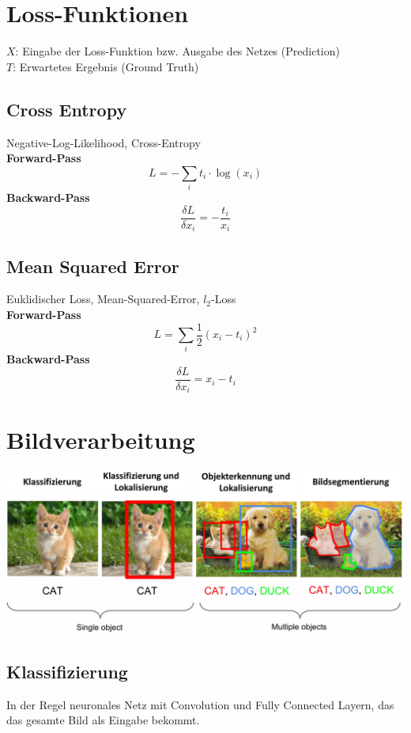 \documentclass[12pt]{article}
\begin{document}
	\section{Loss-Funktionen}
	$X$: Eingabe der Loss-Funktion bzw. Ausgabe des Netzes (Prediction)\\
	$T$: Erwartetes Ergebnis (Ground Truth)
	\subsection{Cross Entropy}
	Negative-Log-Likelihood, Cross-Entropy\\
	\textbf{Forward-Pass} $$L = -\sum_i t_i \cdot \log(x_i)$$
	\textbf{Backward-Pass} $$\frac{\delta L}{\delta x_i} = -\frac{t_i}{x_i}$$
	\subsection{Mean Squared Error}
	Euklidischer Loss, Mean-Squared-Error, $l_2$-Loss\\
	\textbf{Forward-Pass} $$L = \sum_i \frac{1}{2} (x_i - t_i)^2$$
	\textbf{Backward-Pass} $$\frac{\delta L}{\delta x_i} = x_i - t_i$$

	\section{Bildverarbeitung}
	\includegraphics[width=\linewidth]{figures/bildverarbeitung.png}
	\subsection{Klassifizierung}
	In der Regel neuronales Netz mit Convolution und Fully Connected Layern, das das gesamte Bild als Eingabe bekommt.
\end{document}
